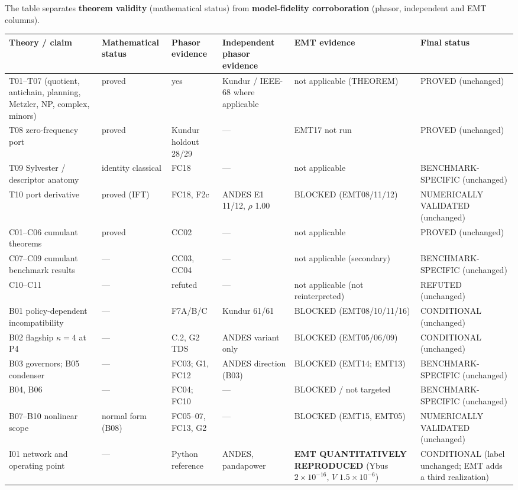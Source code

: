 \documentclass[10pt,a4paper]{article}
\begin{document}
The table separates \textbf{theorem validity} (mathematical status) from
\textbf{model-fidelity corroboration} (phasor, independent and EMT columns).

{\footnotesize
\begin{longtable}{@{}L{3.0cm}L{1.5cm}L{2.0cm}L{2.0cm}L{3.1cm}L{3.0cm}@{}}
\toprule
Theory / claim & Mathem\-atical status & Phasor evidence & Independent phasor evidence & EMT evidence & Final status\\
\midrule\endhead
T01--T07 (quotient, antichain, planning, Metzler, NP, complex, minors) & proved & yes & Kundur / IEEE-68 where applicable & not applicable (THEOREM) & PROVED (unchanged)\\
T08 zero-frequency port & proved & Kundur holdout 28/29 & --- & EMT17 not run & PROVED (unchanged)\\
T09 Sylvester / descriptor anatomy & identity classical & FC18 & --- & not applicable & BENCHMARK-SPECIFIC (unchanged)\\
T10 port derivative & proved (IFT) & FC18, F2c & ANDES E1 11/12, $\rho$ 1.00 & BLOCKED (EMT08/11/12) & NUMERICALLY VALIDATED (unchanged)\\
C01--C06 cumulant theorems & proved & CC02 & --- & not applicable & PROVED (unchanged)\\
C07--C09 cumulant benchmark results & --- & CC03, CC04 & --- & not applicable (secondary) & BENCHMARK-SPECIFIC (unchanged)\\
C10--C11 & --- & refuted & --- & not applicable (not reinterpreted) & REFUTED (unchanged)\\
B01 policy-dependent incompatibility & --- & F7A/B/C & Kundur 61/61 & BLOCKED (EMT08/10/11/16) & CONDITIONAL (unchanged)\\
B02 flagship $\kappa=4$ at P4 & --- & C.2, G2 TDS & ANDES variant only & BLOCKED (EMT05/06/09) & CONDITIONAL (unchanged)\\
B03 governors; B05 condenser & --- & FC03; G1, FC12 & ANDES direction (B03) & BLOCKED (EMT14; EMT13) & BENCHMARK-SPECIFIC (unchanged)\\
B04, B06 & --- & FC04; FC10 & --- & BLOCKED / not targeted & BENCHMARK-SPECIFIC (unchanged)\\
B07--B10 nonlinear scope & normal form (B08) & FC05--07, FC13, G2 & --- & BLOCKED (EMT15, EMT05) & NUMERICALLY VALIDATED (unchanged)\\
I01 network and operating point & --- & Python reference & ANDES, pandapower & \textbf{EMT QUANTITATIVELY REPRODUCED} (Ybus $2\times10^{-16}$, $V$ $1.5\times10^{-6}$) & CONDITIONAL (label unchanged; EMT adds a third realization)\\

\end{longtable}}
\end{document}
